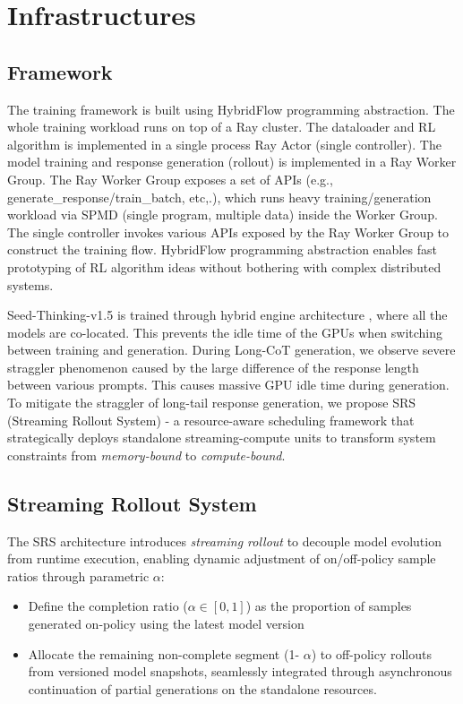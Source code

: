 \section{Infrastructures}


\subsection{Framework}
The training framework is built using HybridFlow \cite{sheng2024hybridflow} programming abstraction. The whole training workload runs on top of a Ray \cite{ray} cluster. The dataloader and RL algorithm is implemented in a single process Ray Actor (single controller). The model training and response generation (rollout) is implemented in a Ray Worker Group. The Ray Worker Group exposes a set of APIs (e.g., generate\_response/train\_batch, etc,.), which runs heavy training/generation workload via SPMD (single program, multiple data) inside the Worker Group. The single controller invokes various APIs exposed by the Ray Worker Group to construct the training flow. HybridFlow programming abstraction enables fast prototyping of RL algorithm ideas without bothering with complex distributed systems.

Seed-Thinking-v1.5 is trained through hybrid engine architecture \cite{yao2023deepspeedchateasyfastaffordable}, where all the models are co-located. This prevents the idle time of the GPUs when switching between training and generation. During Long-CoT generation, we observe severe straggler phenomenon caused by the large difference of the response length between various prompts. This causes massive GPU idle time during generation. To mitigate the straggler of long-tail response generation, we propose SRS (Streaming Rollout System) - a resource-aware scheduling framework that strategically deploys standalone streaming-compute units to transform system constraints from \textit{memory-bound} to \textit{compute-bound}.

\subsection{Streaming Rollout System}
The SRS architecture introduces \textit{streaming rollout} to decouple model evolution from runtime execution, enabling dynamic adjustment of on/off-policy sample ratios through parametric $\alpha$:
\begin{itemize}
\item Define the completion ratio ($\alpha \in [0,1]$) as the proportion of samples generated on-policy using the latest model version
\item Allocate the remaining non-complete segment (1- $\alpha $) to off-policy rollouts from versioned model snapshots, seamlessly integrated through asynchronous continuation of partial generations on the standalone resources.
\end{itemize}

